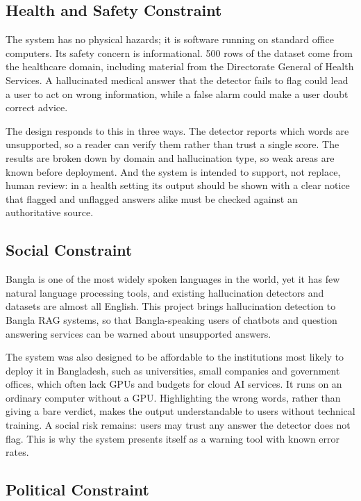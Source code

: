 \subsection{Health and Safety Constraint}

The system has no physical hazards; it is software running on standard office
computers. Its safety concern is informational. 500 rows of the dataset come
from the healthcare domain, including material from the Directorate General of
Health Services. A hallucinated medical answer that the detector fails to flag
could lead a user to act on wrong information, while a false alarm could make
a user doubt correct advice.

The design responds to this in three ways. The detector reports which words
are unsupported, so a reader can verify them rather than trust a single score.
The results are broken down by domain and hallucination type, so weak areas are
known before deployment. And the system is intended to support, not replace,
human review: in a health setting its output should be shown with a clear
notice that flagged and unflagged answers alike must be checked against an
authoritative source.

\subsection{Social Constraint}

Bangla is one of the most widely spoken languages in the world, yet it has few
natural language processing tools, and existing hallucination detectors and
datasets are almost all English. This project brings hallucination detection
to Bangla RAG systems, so that Bangla-speaking users of chatbots and question
answering services can be warned about unsupported answers.

The system was also designed to be affordable to the institutions most likely
to deploy it in Bangladesh, such as universities, small companies and
government offices, which often lack GPUs and budgets for cloud AI services.
It runs on an ordinary computer without a GPU. Highlighting the wrong words,
rather than giving a bare verdict, makes the output understandable to users
without technical training. A social risk remains: users may trust any answer
the detector does not flag. This is why the system presents itself as a
warning tool with known error rates.

\subsection{Political Constraint}

